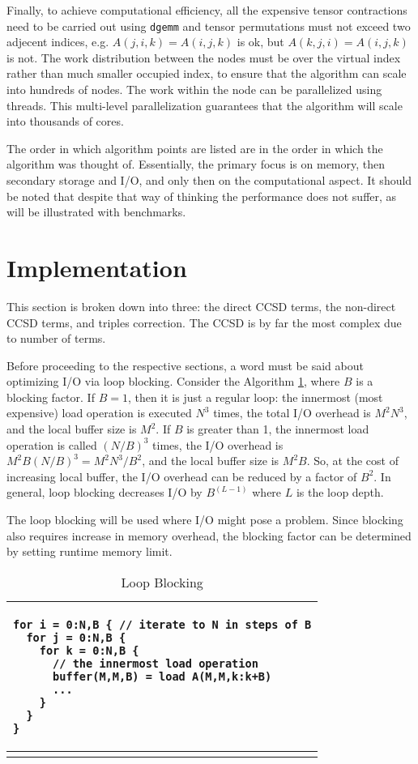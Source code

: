 \documentclass[12pt]{article} \usepackage[margin=1in]{geometry}
\newenvironment{listing}%
               {\begin{table}
                   \begin{tabular}{ p{6in} }
                     \hline}%
               {\end{tabular}%
               \end{table}}
\begin{document}
Finally, to achieve computational efficiency, all the expensive tensor
contractions need to be carried out using {\tt dgemm} and tensor
permutations must not exceed two adjecent indices, e.g.
 $A(j,i,k) = A(i,j,k)$ is ok, but $A(k,j,i) = A(i,j,k)$ is not.
The work distribution between the nodes must be over the virtual index
rather than much smaller occupied index, to ensure that the algorithm
can scale into hundreds of nodes.  The work within the node can be
parallelized using threads.  This multi-level parallelization
guarantees that the algorithm will scale into thousands of cores.

The order in which algorithm points are listed are in the order in
which the algorithm was thought of.  Essentially, the primary focus is
on memory, then secondary storage and I/O, and only then on the
computational aspect.  It should be noted that despite that way of
thinking the performance does not suffer, as will be illustrated with
benchmarks.

\section{Implementation}
This section is broken down into three: the direct CCSD terms,
the non-direct CCSD terms, and triples correction.  The CCSD is by far
the most complex due to number of terms.

Before proceeding to the respective sections, a word must be said
about optimizing I/O via loop blocking.  Consider the Algorithm
 \ref{blocking}, where $B$ is a blocking factor. If $B = 1$, then
it is just a regular loop: the innermost (most expensive) load
operation is executed $N^3$ times, the total I/O overhead is $M^2N^3$,
and the local buffer size is $M^2$.  If $B$ is greater than 1, the
innermost load operation is called $(N/B)^3$ times, the I/O overhead
is $M^2B(N/B)^3 = M^2 N^3 /B^2$, and the local buffer size is $M^2B$.
So, at the cost of increasing local buffer, the I/O overhead can be
reduced by a factor of $B^2$.  In general, loop blocking decreases I/O
by $B^{(L-1)}$  where $L$ is the loop depth.

The loop blocking will be used where I/O might pose a problem.  Since
blocking also requires increase in memory overhead, the blocking
factor can be determined by setting runtime memory limit.

\begin {listing}
\begin {verbatim}
for i = 0:N,B { // iterate to N in steps of B
  for j = 0:N,B {
    for k = 0:N,B {
      // the innermost load operation
      buffer(M,M,B) = load A(M,M,k:k+B)
      ...
    }
  }
}
\end{verbatim} \\
\hline
\caption{Loop Blocking}
\label{blocking}
\end{listing}
\end{document}
